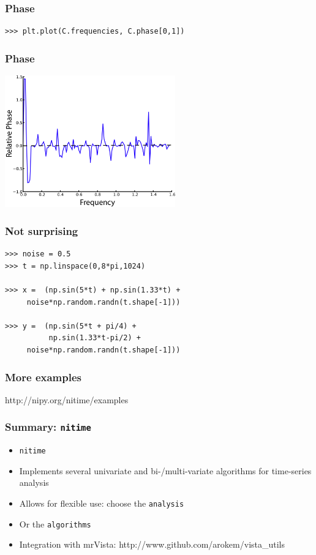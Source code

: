 \documentclass{beamer}
\begin{document}
\begin{frame}[fragile]
\frametitle{Phase}
\begin{lstlisting}
>>> plt.plot(C.frequencies, C.phase[0,1])
\end{lstlisting}
\end{frame}

\begin{frame}
\frametitle{Phase}
\includegraphics[height=5.7cm]{figures/outa_phase_tseries_ph}
\end{frame}

\begin{frame}[fragile]
\frametitle{Not surprising}
\begin{lstlisting}
>>> noise = 0.5
>>> t = np.linspace(0,8*pi,1024) 

>>> x =  (np.sin(5*t) + np.sin(1.33*t) +  
     noise*np.random.randn(t.shape[-1]))

>>> y =  (np.sin(5*t + pi/4) + 
          np.sin(1.33*t-pi/2) +
     noise*np.random.randn(t.shape[-1]))
\end{lstlisting}
\end{frame}


\begin{frame}
\frametitle{More examples}
http://nipy.org/nitime/examples
\end{frame}

\begin{frame}
\frametitle{Summary: \tt{nitime}}
\begin{itemize}
\pause
\item
\tt{nitime} 
\pause
\item
Implements several univariate and bi-/multi-variate algorithms for time-series
analysis 
\pause
\item
Allows for flexible use: choose the \tt{analysis} 
\pause
\item
Or the \tt{algorithms} 
\item 
Integration with mrVista: http://www.github.com/arokem/vista_utils

\end{itemize}
\end{frame}
\end{document}
